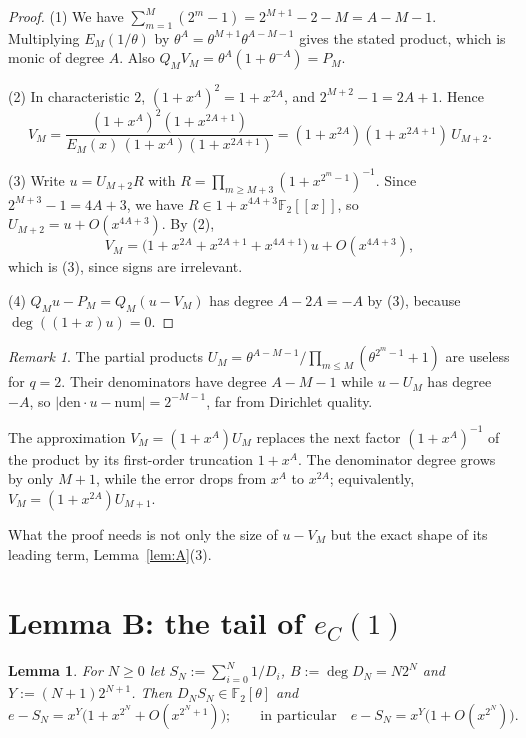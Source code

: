 \documentclass[11pt]{amsart}
\newtheorem{lemma}[theorem]{Lemma}
\theoremstyle{remark}
\newtheorem{remark}[theorem]{Remark}
\numberwithin{equation}{section}
\newcommand{\F}{\mathbb{F}}
\newcommand{\eC}{e_C}
\begin{document}
\begin{proof}
(1) We have $\sum_{m=1}^M(2^m-1)=2^{M+1}-2-M=A-M-1$. Multiplying $E_M(1/\theta)$ by $\theta^A=\theta^{M+1}\theta^{A-M-1}$ gives the stated product, which is monic of degree $A$. Also $Q_MV_M=\theta^A(1+\theta^{-A})=P_M$.

(2) In characteristic $2$, $(1+x^A)^2=1+x^{2A}$, and $2^{M+2}-1=2A+1$. Hence
\[
V_M=\frac{(1+x^A)^2(1+x^{2A+1})}{E_M(x)\,(1+x^A)(1+x^{2A+1})}=(1+x^{2A})(1+x^{2A+1})\,U_{M+2}.
\]

(3) Write $u=U_{M+2}R$ with $R=\prod_{m\ge M+3}(1+x^{2^m-1})^{-1}$. Since $2^{M+3}-1=4A+3$, we have $R\in1+x^{4A+3}\F_2[[x]]$, so $U_{M+2}=u+O(x^{4A+3})$. By (2),
\[
V_M=\bigl(1+x^{2A}+x^{2A+1}+x^{4A+1}\bigr)\,u+O(x^{4A+3}),
\]
which is (3), since signs are irrelevant.

(4) $Q_Mu-P_M=Q_M(u-V_M)$ has degree $A-2A=-A$ by (3), because $\deg((1+x)u)=0$.
\end{proof}

\begin{remark}\label{rem:A}
The partial products $U_M=\theta^{A-M-1}/\prod_{m\le M}(\theta^{2^m-1}+1)$ are useless for $q=2$. Their denominators have degree $A-M-1$ while $u-U_M$ has degree $-A$, so $|\mathrm{den}\cdot u-\mathrm{num}|=2^{-M-1}$, far from Dirichlet quality.

The approximation $V_M=(1+x^A)U_M$ replaces the next factor $(1+x^A)^{-1}$ of the product by its first-order truncation $1+x^A$. The denominator degree grows by only $M+1$, while the error drops from $x^A$ to $x^{2A}$; equivalently, $V_M=(1+x^{2A})U_{M+1}$.

What the proof needs is not only the size of $u-V_M$ but the exact shape of its leading term, Lemma~\ref{lem:A}(3).
\end{remark}

\section{Lemma B: the tail of \texorpdfstring{$\eC(1)$}{e\_C(1)}}\label{sec:B}

\begin{lemma}\label{lem:B}
For $N\ge0$ let $S_N:=\sum_{i=0}^N1/D_i$, $B:=\deg D_N=N2^N$ and $Y:=(N+1)2^{N+1}$. Then $D_NS_N\in\F_2[\theta]$ and
\[
e-S_N=x^{Y}\bigl(1+x^{2^N}+O(x^{2^N+1})\bigr);\qquad\text{in particular}\quad e-S_N=x^Y\bigl(1+O(x^{2^N})\bigr).
\]
\end{lemma}
\end{document}

